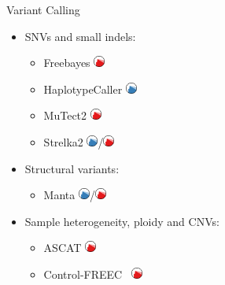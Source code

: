 \documentclass[usepdftitle=false]{beamer}
\begin{document}
\begin{frame}{Variant Calling}
	\begin{itemize}
		\item SNVs and small indels:
		\pause
	\begin{itemize}
			\item Freebayes \includegraphics[height=1em]{pictures/Sarek_somatic-logo}
			\item HaplotypeCaller \includegraphics[height=1em]{pictures/Sarek_germline-logo}
			\item MuTect2  \includegraphics[height=1em]{pictures/Sarek_somatic-logo}
			\item Strelka2  \includegraphics[height=1em]{pictures/Sarek_germline-logo}/\includegraphics[height=1em]{pictures/Sarek_somatic-logo}
		\end{itemize}
		\pause
		\item Structural variants:
		\pause
		\begin{itemize}
			\item Manta \includegraphics[height=1em]{pictures/Sarek_germline-logo}/\includegraphics[height=1em]{pictures/Sarek_somatic-logo}
		\end{itemize}
		\item Sample heterogeneity, ploidy and CNVs:
		\pause
		\begin{itemize}
			\item ASCAT  \includegraphics[height=1em]{pictures/Sarek_somatic-logo}
			\item Control-FREEC \faWrench\  \includegraphics[height=1em]{pictures/Sarek_somatic-logo}
		\end{itemize}
	\end{itemize}
\end{frame}
\end{document}
